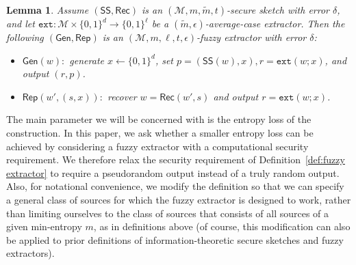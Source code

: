 \documentclass[11pt]{article}
\newcommand{\secref}[1]{\mbox{Section~\ref{#1}}}
\newcommand{\defref}[1]{\mbox{Definition~\ref{#1}}}
\newcommand{\class}[1]{{\ensuremath{\mathsf{#1}}}}
\newcommand{\gen}{\ensuremath{\class{Gen}}\xspace}
\newcommand{\rep}{\ensuremath{\class{Rep}}\xspace}
\newcommand{\sketch}{\ensuremath{\class{SS}}\xspace}
\newcommand{\rec}{\ensuremath{\class{Rec}}\xspace}
\newcommand{\zo}{\ensuremath{\{0, 1\}}}
\newcommand{\dis}{\ensuremath{\mathsf{dis}}}
\newcommand{\ext}{\ensuremath{\mathtt{ext}}}
\newtheorem{lemma}[theorem]{Lemma}
\newtheorem{definition}[theorem]{Definition}
\newcommand{\authnote}[2]{{\textcolor{red}{\textsf{#1 notes: }\textcolor{blue}{ #2}}\marginpar{\textcolor{red}{\textbf{!!!!!}}}}}
\newcommand{\authnote}[2]{}
\newcommand{\lnote}[1]{{\authnote{Leo}{#1}}}
\begin{document}
\begin{lemma}%
\label{lem:fuzzy ext construction}
Assume $(\sketch, \rec)$ is an $(\mathcal{M}, m, \tilde{m}, t)$-secure sketch with error $\delta$, and let $\ext:\mathcal{M}\times \zo^d \rightarrow \zo^\ell$ be a $(\tilde{m}, \epsilon)$-average-case extractor.  Then the following $(\gen, \rep)$ is an $(\mathcal{M}, m, \ell, t, \epsilon)$-fuzzy extractor with error $\delta$:
\begin{itemize}
\item $\gen(w):$ generate $x\leftarrow \zo^d$, set $p=(\sketch(w), x), r=\ext(w;x)$, and output $(r,p)$.
\item $\rep(w', (s, x)):$ recover $w=\rec(w',s)$ and output $r=\ext(w;x)$.
\end{itemize}
\end{lemma}
The main parameter we will be concerned with is the entropy loss of the construction.  In this paper, we ask whether a smaller entropy loss can be achieved by considering a fuzzy extractor with a computational security requirement.  We therefore relax the security requirement of \defref{def:fuzzy extractor} to require a pseudorandom output instead of a truly random output.  Also, for notational convenience, we modify the definition so that we can specify a general class of sources for which the fuzzy extractor is designed to work, rather than limiting ourselves to the class of sources that consists of all sources of a given min-entropy $m$, as in definitions above (of course, this modification can also be applied to prior definitions of information-theoretic secure sketches and fuzzy extractors).
\end{document}
